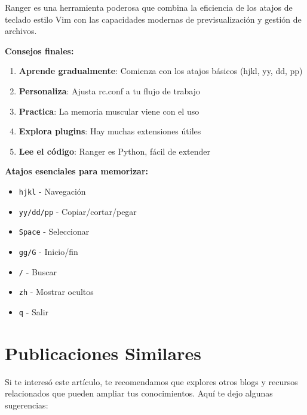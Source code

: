 \documentclass[
  doc,
  floatsintext,
  longtable,
  a4paper,
  nolmodern,
  notxfonts,
  notimes,
  12pt,
  colorlinks=true,linkcolor=blue,citecolor=blue,urlcolor=blue]{apa7}
\providecommand{\tightlist}{%
  \setlength{\itemsep}{0pt}\setlength{\parskip}{0pt}}
\begin{document}
Ranger es una herramienta poderosa que combina la eficiencia de los
atajos de teclado estilo Vim con las capacidades modernas de
previsualización y gestión de archivos.

\textbf{Consejos finales:}

\begin{enumerate}
\def\labelenumi{\arabic{enumi}.}
\tightlist
\item
  \textbf{Aprende gradualmente}: Comienza con los atajos básicos (hjkl,
  yy, dd, pp)
\item
  \textbf{Personaliza}: Ajusta rc.conf a tu flujo de trabajo
\item
  \textbf{Practica}: La memoria muscular viene con el uso
\item
  \textbf{Explora plugins}: Hay muchas extensiones útiles
\item
  \textbf{Lee el código}: Ranger es Python, fácil de extender
\end{enumerate}

\textbf{Atajos esenciales para memorizar:}

\begin{itemize}
\tightlist
\item
  \texttt{hjkl} - Navegación
\item
  \texttt{yy/dd/pp} - Copiar/cortar/pegar
\item
  \texttt{Space} - Seleccionar
\item
  \texttt{gg/G} - Inicio/fin
\item
  \texttt{/} - Buscar
\item
  \texttt{zh} - Mostrar ocultos
\item
  \texttt{q} - Salir
\end{itemize}

\section{Publicaciones Similares}\label{publicaciones-similares}

Si te interesó este artículo, te recomendamos que explores otros blogs y
recursos relacionados que pueden ampliar tus conocimientos. Aquí te dejo
algunas sugerencias:
\end{document}
